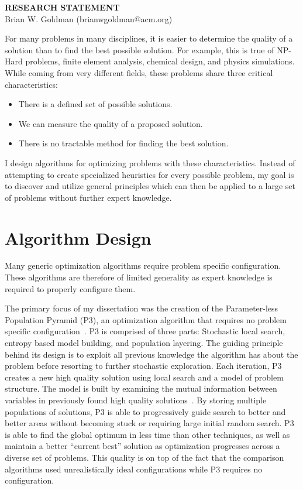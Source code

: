 \documentclass[a4paper, 11pt]{article}
\begin{document}
\thispagestyle{empty}

\pagestyle{fancy}

\begin{center}
{\LARGE \bf RESEARCH STATEMENT}\\
\vspace*{0.1cm}
{\normalsize Brian W. Goldman (brianwgoldman@acm.org)}
\end{center}

\noindent
For many problems in many disciplines, it is easier to determine the quality of a solution
than to find the best possible solution. For example, this is true of NP-Hard problems,
finite element analysis, chemical design, and physics simulations.
While coming from very different fields, these problems share
three critical characteristics:
\begin{itemize}
\item There is a defined set of possible solutions.
\item We can measure the quality of a proposed solution.
\item There is no tractable method for finding the best solution.
\end{itemize}
I design algorithms for optimizing problems with these characteristics. Instead of
attempting to create specialized heuristics for every possible problem,
my goal is to discover and utilize general principles which can
then be applied to a large set of problems without further expert knowledge.

\section{Algorithm Design}
Many generic optimization algorithms require problem specific
configuration. These algorithms are therefore of limited generality
as expert knowledge is required to properly configure them.

The primary focus of my dissertation was the creation of the
Parameter-less Population Pyramid (P3), an optimization algorithm
that requires no problem specific configuration~\cite{goldman:2014:p3,goldman:2015:fastp3}.
P3 is comprised of three parts: Stochastic local search, entropy based model building, and
population layering. The guiding principle behind its design is to exploit all previous
knowledge the algorithm has about the problem before resorting to further stochastic exploration.
Each iteration, P3 creates a new high quality solution using local search and a model of
problem structure. The model is built by examining the mutual information between variables
in previously found high quality solutions~\cite{goldman:2012:ltga}.
By storing multiple populations of solutions, P3 is able to progressively guide search
to better and better areas without becoming stuck or requiring large initial random search.
P3 is able to find the global optimum in less time than other techniques, as well as
maintain a better ``current best'' solution as optimization progresses across a diverse set of problems.
This quality is on top
of the fact that the comparison algorithms used unrealistically ideal configurations while
P3 requires no configuration.
\end{document}
